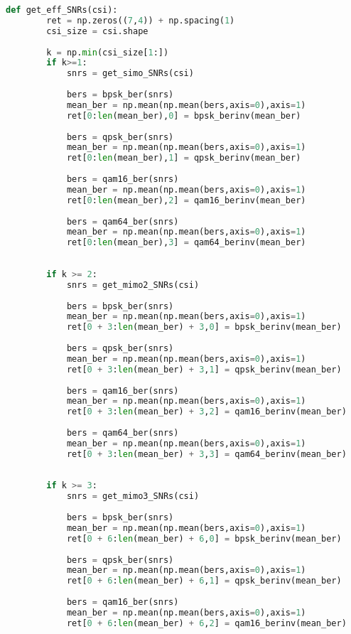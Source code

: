 \documentclass[UTF8]{article}
\begin{document}
\begin{lstlisting}[language=Python, caption=$ get\_SNRs.py $]
    def get_eff_SNRs(csi):
        ret = np.zeros((7,4)) + np.spacing(1)
        csi_size = csi.shape
    
        k = np.min(csi_size[1:])
        if k>=1:
            snrs = get_simo_SNRs(csi)
    
            bers = bpsk_ber(snrs)
            mean_ber = np.mean(np.mean(bers,axis=0),axis=1)
            ret[0:len(mean_ber),0] = bpsk_berinv(mean_ber)
    
            bers = qpsk_ber(snrs)
            mean_ber = np.mean(np.mean(bers,axis=0),axis=1)
            ret[0:len(mean_ber),1] = qpsk_berinv(mean_ber)
    
            bers = qam16_ber(snrs)
            mean_ber = np.mean(np.mean(bers,axis=0),axis=1)
            ret[0:len(mean_ber),2] = qam16_berinv(mean_ber)
    
            bers = qam64_ber(snrs)
            mean_ber = np.mean(np.mean(bers,axis=0),axis=1)
            ret[0:len(mean_ber),3] = qam64_berinv(mean_ber)
    
        
        if k >= 2:
            snrs = get_mimo2_SNRs(csi)
    
            bers = bpsk_ber(snrs)
            mean_ber = np.mean(np.mean(bers,axis=0),axis=1)
            ret[0 + 3:len(mean_ber) + 3,0] = bpsk_berinv(mean_ber)
    
            bers = qpsk_ber(snrs)
            mean_ber = np.mean(np.mean(bers,axis=0),axis=1)
            ret[0 + 3:len(mean_ber) + 3,1] = qpsk_berinv(mean_ber)
    
            bers = qam16_ber(snrs)
            mean_ber = np.mean(np.mean(bers,axis=0),axis=1)
            ret[0 + 3:len(mean_ber) + 3,2] = qam16_berinv(mean_ber)
    
            bers = qam64_ber(snrs)
            mean_ber = np.mean(np.mean(bers,axis=0),axis=1)
            ret[0 + 3:len(mean_ber) + 3,3] = qam64_berinv(mean_ber)
    
    
        if k >= 3:
            snrs = get_mimo3_SNRs(csi)
    
            bers = bpsk_ber(snrs)
            mean_ber = np.mean(np.mean(bers,axis=0),axis=1)
            ret[0 + 6:len(mean_ber) + 6,0] = bpsk_berinv(mean_ber)
    
            bers = qpsk_ber(snrs)
            mean_ber = np.mean(np.mean(bers,axis=0),axis=1)
            ret[0 + 6:len(mean_ber) + 6,1] = qpsk_berinv(mean_ber)
    
            bers = qam16_ber(snrs)
            mean_ber = np.mean(np.mean(bers,axis=0),axis=1)
            ret[0 + 6:len(mean_ber) + 6,2] = qam16_berinv(mean_ber)
    

\end{lstlisting}
\end{document}
